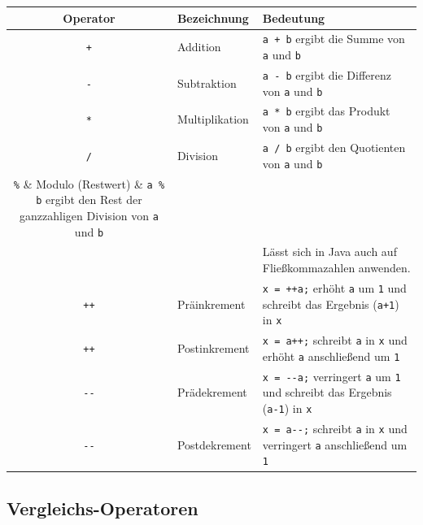 \begin{tabular}{|c|l|l|}\hline
\textbf{Operator} & \textbf{Bezeichnung} & \textbf{Bedeutung}
\\ \hline
{\lstinline|+|} & Addition & {\lstinline|a + b|} ergibt die Summe von
{\lstinline|a|} und {\lstinline|b|}
\\ \hline
{\lstinline|-|} & Subtraktion & {\lstinline|a - b|} ergibt die Differenz von
{\lstinline|a|} und {\lstinline|b|}
\\ \hline
{\lstinline|*|} & Multiplikation & {\lstinline|a * b|} ergibt das Produkt
von {\lstinline|a|} und {\lstinline|b|}
\\ \hline
{\lstinline|/|} & Division & {\lstinline|a / b|} ergibt den Quotienten
von {\lstinline|a|} und {\lstinline|b|}
\\ \hline
{\lstinline|%|} & Modulo (Restwert) & {\lstinline|a % b|} ergibt den Rest der
ganzzahligen Division von {\lstinline|a|} und {\lstinline|b|}
\\ 
& & Lässt sich in Java auch auf Fließkommazahlen anwenden.
\\ \hline
{\lstinline|++|} & Präinkrement & {\lstinline|x = ++a;|} erhöht {\lstinline|a|}
um {\lstinline|1|} und schreibt das Ergebnis ({\lstinline|a+1|}) in
{\lstinline|x|}
\\ \hline
{\lstinline|++|} & Postinkrement & {\lstinline|x = a++;|} schreibt
{\lstinline|a|} in {\lstinline|x|} und erhöht {\lstinline|a|} anschließend um
{\lstinline|1|} 
\\ \hline
{\lstinline|--|} & Prädekrement & {\lstinline|x = --a;|} verringert
{\lstinline|a|} um {\lstinline|1|} und schreibt das Ergebnis ({\lstinline|a-1|})
in {\lstinline|x|} 
\\ \hline
{\lstinline|--|} & Postdekrement & {\lstinline|x = a--;|} schreibt
{\lstinline|a|} in {\lstinline|x|} und verringert {\lstinline|a|} anschließend
um {\lstinline|1|}
\\ \hline
\end{tabular}


\subsection{Vergleichs-Operatoren}

